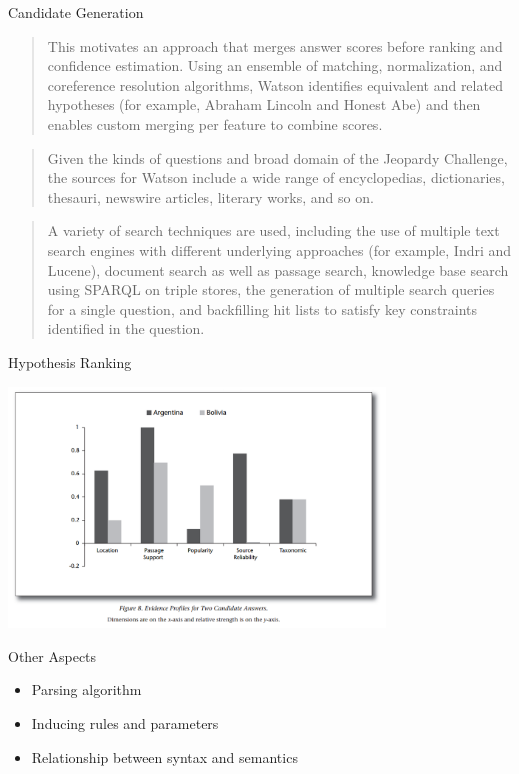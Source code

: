 \documentclass{beamer}
\begin{document}
\begin{frame}{Candidate Generation}
  
\end{frame}

\begin{frame}
  \begin{quote}
    This motivates an approach that merges answer scores before
    ranking and confidence estimation.  Using an ensemble of matching,
    normalization, and coreference resolution algorithms, Watson
    identifies equivalent and related hypotheses (for example, Abraham
    Lincoln and Honest Abe) and then enables custom merging per
    feature to combine scores.
  \end{quote}
\end{frame}

\begin{frame}
  \begin{quote}
    Given the kinds of questions and broad domain of the Jeopardy
    Challenge, the sources for Watson include a wide range of
    encyclopedias, dictionaries, thesauri, newswire articles, literary
    works, and so on.
  \end{quote}
\end{frame}

\begin{frame}
  \begin{quote}
    A variety of search techniques are used, including the use of
    multiple text search engines with different underlying approaches
    (for example, Indri and Lucene), document search as well as
    passage search, knowledge base search using SPARQL on triple
    stores, the generation of multiple search queries for a single
    question, and backfilling hit lists to satisfy key constraints
    identified in the question.
  \end{quote}
\end{frame}

\begin{frame}{Hypothesis Ranking}
  \begin{center}
    \includegraphics[width=10cm]{deepqaanalysis}
  \end{center}
\end{frame}

\begin{frame}{Other Aspects}
  \begin{itemize}
  \item Parsing algorithm
    \air 
  \item Inducing rules and parameters
    \air 
  \item Relationship between syntax and semantics
  \end{itemize}
\end{frame}

{

}
\end{document}
